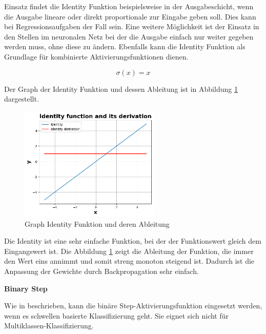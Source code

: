 Einsatz findet die Identity Funktion beispielsweise in der Ausgabeschicht, wenn die Ausgabe lineare oder direkt proportionale zur Eingabe geben soll. Dies kann bei Regressionsaufgaben der Fall sein. Eine weitere Möglichkeit ist der Einsatz in den Stellen im neuronalen Netz bei der die Ausgabe einfach nur weiter gegeben werden muss, ohne diese zu ändern. Ebenfalls kann die Identity Funktion als Grundlage für kombinierte Aktivierungsfunktionen dienen.

\begin{equation}\label{eq:identity_activation_function}
	\sigma (x) = x
\end{equation}

Der Graph der Identity Funktion und dessen Ableitung ist in Abbildung \ref{img:identity_func_graph} dargestellt. 

\begin{figure}[!ht]
	\includegraphics[width=0.6\textwidth]{content/chapter_basics/plots/identity_func_plot.eps}
	\centering
	\caption{Graph Identity Funktion und deren Ableitung}
	\label{img:identity_func_graph}
\end{figure}

Die Identity ist eine sehr einfache Funktion, bei der der Funktionswert gleich dem Eingangswert ist. Die Abbildung \ref{img:identity_func_graph} zeigt die Ableitung der Funktion, die immer den Wert eins annimmt und somit streng monoton steigend ist. Dadurch ist die Anpassung der Gewichte durch Backpropagation sehr einfach.\vspace{0.2cm}

%
\textbf{Binary Step}\vspace{0.2cm}

Wie in \cite[311-312]{sharma-2020} beschrieben, kann die binäre Step-Aktivierungsfunktion eingesetzt werden, wenn es schwellen basierte Klassifizierung geht. Sie eignet sich nicht für Multiklassen-Klassifizierung.

